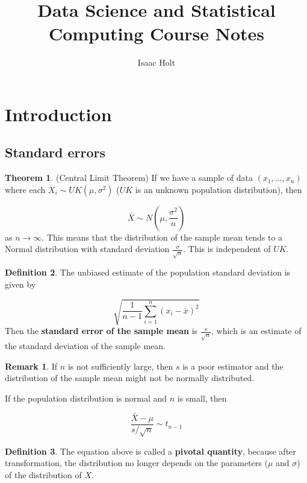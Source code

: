 \documentclass[12pt,a4paper]{article}
\title{Data Science and Statistical Computing Course Notes}
\author{Isaac Holt}
\theoremstyle{definition}
\newtheorem{definition}{Definition}[subsection]
\newtheorem{theorem}[definition]{Theorem}
\newtheorem*{remark}{Remark}
\begin{document}
\maketitle

\section{Introduction}

\subsection{Standard errors}

\begin{theorem}
	(Central Limit Theorem) If we have a sample of data $(x_1, \dots, x_n)$ where each $X_i \sim UK(\mu, \sigma^2)$ ($UK$ is an unknown population distribution), then

	\[ \bar{X} \sim N\left(\mu, \frac{\sigma^2}{n}\right) \]
	as $n \rightarrow \infty$. This means that the distribution of the sample mean tends to a Normal distribution with standard deviation $\frac{\sigma}{\sqrt{n}}$. This is independent of $UK$.
\end{theorem}

\begin{definition}
	The unbiased estimate of the population standard deviation is given by

	\[ \sqrt{\frac{1}{n - 1} \sum_{i = 1}^n {\left(x_i - \bar{x}\right)}^2} \]
	Then the \textbf{standard error of the sample mean} is $\frac{s}{\sqrt{n}}$, which is an estimate of the standard deviation of the sample mean.
\end{definition}

\begin{remark}
	If $n$ is not sufficiently large, then $s$ is a poor estimator and the distribution of the sample mean might not be normally distributed.

	If the population distribution is normal and $n$ is small, then

	\[ \frac{\bar{X} - \mu}{s / \sqrt{n}} \sim t_{n - 1} \]
\end{remark}

\begin{definition}
	The equation above is called a \textbf{pivotal quantity}, because after transformation, the distribution no longer depends on the parameters ($\mu$ and $\sigma$) of the distribution of $X$.
\end{definition}
\end{document}
